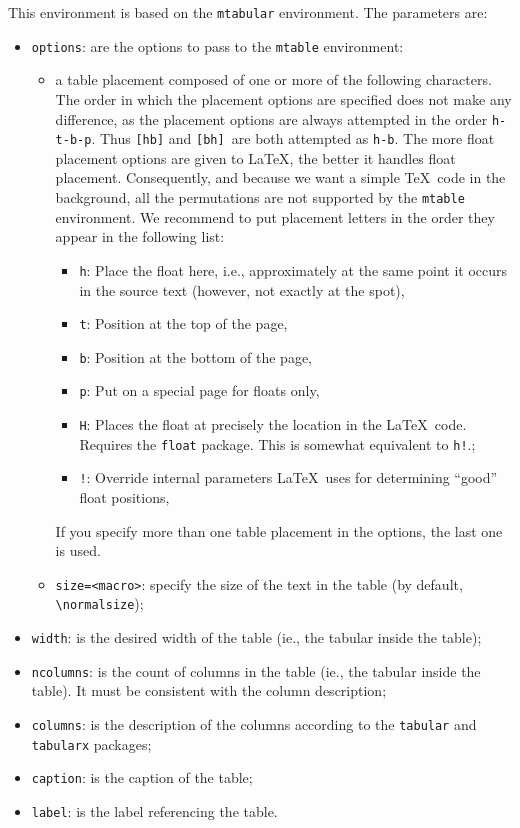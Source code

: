 \documentclass[book,taskpackage,specpackage,codepackage]{upmethodology-document}
\begin{document}
This environment is based on the \texttt{mtabular} environment. The parameters are:
\begin{itemize}
\item \texttt{options}: are the options to pass to the \texttt{mtable} environment: \begin{itemize}
		\item a table placement composed of one or more of the following characters. The order in which the placement options are specified does not make any difference, as the placement options are always attempted in the order \texttt{h-t-b-p}. Thus \texttt{[hb]} and \texttt{[bh] }are both attempted as \texttt{h-b}. The more float placement options are given to \LaTeX, the better it handles float placement. Consequently, and because we want a simple \TeX\ code in the background, all the permutations are not supported by the \texttt{mtable} environment. We recommend to put placement letters in the order they appear in the following list: \begin{itemize}
		
			\item \texttt{h}: Place the float here, i.e., approximately at the same point it occurs in the source text (however, not exactly at the spot),
			\item \texttt{t}: Position at the top of the page,
			\item \texttt{b}: Position at the bottom of the page,
			\item \texttt{p}: Put on a special page for floats only,
			\item \texttt{H}: Places the float at precisely the location in the \LaTeX\ code. Requires the \texttt{float} package. This is somewhat equivalent to \texttt{h!}.;
			\item \texttt{!}: Override internal parameters \LaTeX\ uses for determining ``good'' float positions,
		\end{itemize}
		If you specify more than one table placement in the options, the last one is used.
		\item \texttt{size=\string<macro\string>}: specify the size of the text in the table (by default, \texttt{{\textbackslash}normalsize});
	\end{itemize}
\item \texttt{width}: is the desired width of the table (ie., the tabular inside the table);
\item \texttt{ncolumns}: is the count of columns in the table (ie., the tabular inside the table). It must be consistent with the column description;
\item \texttt{columns}: is the description of the columns according to the \texttt{tabular} and \texttt{tabularx} packages;
\item \texttt{caption}: is the caption of the table;
\item \texttt{label}: is the label referencing the table.
\end{itemize}
\end{document}
